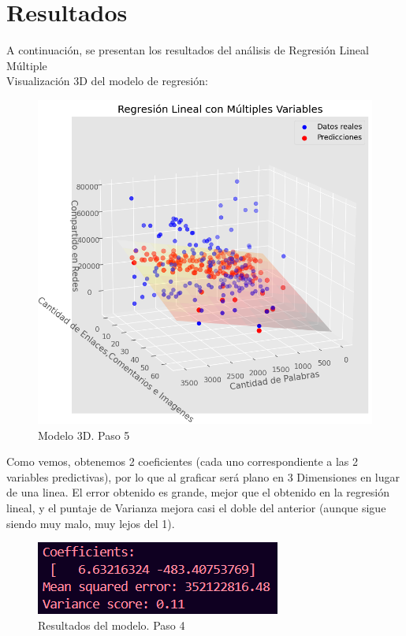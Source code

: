 \documentclass{article}
\begin{document}
\newpage
\section{Resultados}
A continuación, se presentan los resultados del análisis de Regresión Lineal Múltiple\\

Visualización 3D del modelo de regresión:
\begin{figure}[H]
    \centering
    \includegraphics[width=1\linewidth]{img/a10_modelo3D.png}
    \caption{Modelo 3D. Paso 5}
    \label{fig:figure2}
\end{figure}

\newpage

Como vemos, obtenemos 2 coeficientes (cada uno correspondiente a las 2 variables predictivas), por lo que al graficar será plano en 3 Dimensiones en lugar de una linea. El error obtenido es grande, mejor que el obtenido en la regresión lineal, y el puntaje de Varianza mejora casi el doble del anterior (aunque sigue siendo muy malo, muy lejos del 1).
\begin{figure}[H]
    \centering
    \includegraphics[width=0.5\linewidth]{img/a10_ecuacion.png}
    \caption{Resultados del modelo. Paso 4}
    \label{fig:figure2}
\end{figure}
\end{document}
